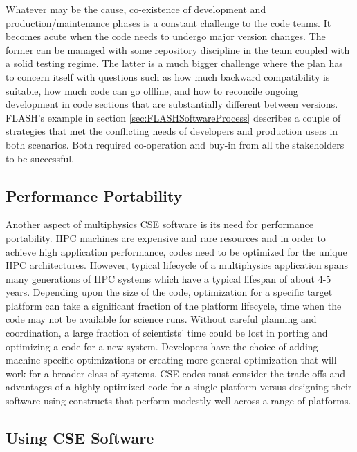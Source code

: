 Whatever may be the cause, co-existence of development and
production/maintenance phases is a constant challenge to the code
teams. It becomes acute when the code needs to undergo major version
changes. The former can be managed with some repository
discipline in the team coupled with a solid testing regime. The latter
is a much bigger challenge where the plan has to concern itself with
questions such as how much backward compatibility is suitable, how
much code can go offline, and how to reconcile ongoing development in
code sections that are substantially different between versions.
FLASH's example in section \ref{sec:FLASHSoftwareProcess} describes
a couple of strategies that met the conflicting needs of developers and
production users in both scenarios. Both required co-operation and
buy-in from all the stakeholders to be successful. 


\subsection{Performance Portability}
\label{sec:perfport}

Another aspect of multiphysics CSE software is its need for
performance portability. HPC machines are expensive and rare resources and in order to achieve high application performance, codes need to be optimized for the unique HPC architectures.
 However, typical lifecycle of a
multiphysics application spans many generations of HPC systems which have a typical lifespan of about 4-5 years.  Depending upon the size of the
code, optimization for a specific target platform can take a
significant fraction of the platform lifecycle, time when the code may not be available for science runs.  Without careful planning and coordination,  a
large fraction of scientists' time could be lost in porting and optimizing
a code for a new system.  Developers have the choice of adding machine
specific optimizations or creating more general optimization that will
work for a broader class of systems.  CSE codes must consider the
trade-offs and advantages of a highly optimized code for a single
platform versus designing their software using constructs that perform
modestly well across a range of platforms. 



\subsection{Using CSE Software}

